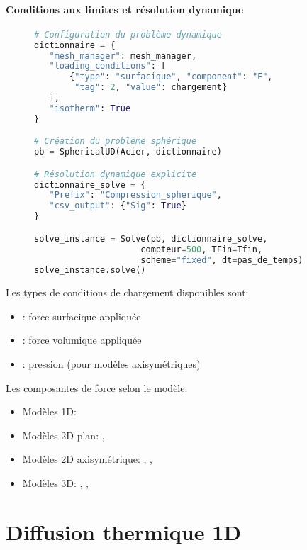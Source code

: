\documentclass[10pt]{book}
\begin{document}
\paragraph{Conditions aux limites et résolution dynamique}

\begin{figure}[h!]
\begin{lstlisting}[language=python]
# Configuration du problème dynamique
dictionnaire = {
   "mesh_manager": mesh_manager,
   "loading_conditions": [
       {"type": "surfacique", "component": "F", 
        "tag": 2, "value": chargement}
   ],
   "isotherm": True
}

# Création du problème sphérique
pb = SphericalUD(Acier, dictionnaire)

# Résolution dynamique explicite
dictionnaire_solve = {
   "Prefix": "Compression_spherique",
   "csv_output": {"Sig": True}
}

solve_instance = Solve(pb, dictionnaire_solve, 
                     compteur=500, TFin=Tfin, 
                     scheme="fixed", dt=pas_de_temps)
solve_instance.solve()
\end{lstlisting}
\end{figure}

Les types de conditions de chargement disponibles sont:
\begin{itemize}
\item {}: force surfacique appliquée
\item {}: force volumique appliquée
\item {}: pression (pour modèles axisymétriques)
\end{itemize}

Les composantes de force selon le modèle:
\begin{itemize}
\item Modèles 1D: 
\item Modèles 2D plan: , 
\item Modèles 2D axisymétrique: , , 
\item Modèles 3D: , , 
\end{itemize}

\clearpage

\section{Diffusion thermique 1D}\label{Section:Diffusion thermique 1D}
\end{document}
